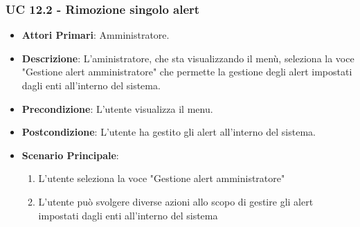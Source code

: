 		\subsubsection{UC 12.2 - Rimozione singolo alert}
		\begin{itemize}
			\item \textbf{Attori Primari}: Amministratore.
			\item \textbf{Descrizione}: L'aministratore, che sta visualizzando il menù, seleziona la voce "Gestione alert amministratore" che permette la gestione degli alert impostati dagli enti all'interno del sistema.
			\item \textbf{Precondizione}: L'utente visualizza il menu.
			\item \textbf{Postcondizione}: L'utente ha gestito gli alert all'interno del sistema.
			\item \textbf{Scenario Principale}:
			\begin{enumerate}
				\item{L'utente seleziona la voce "Gestione alert amministratore"}
				\item{L'utente può svolgere diverse azioni allo scopo di gestire gli alert impostati dagli enti all'interno del sistema}
			\end{enumerate}	
		\end{itemize}